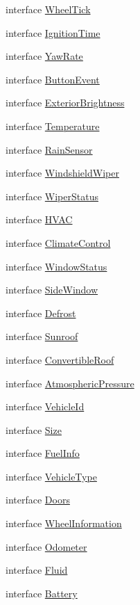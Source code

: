 \begin{DoxyCompactItemize}
interface \hyperlink{interfaceWheelTick}{Wheel\+Tick}
\item 
interface \hyperlink{interfaceIgnitionTime}{Ignition\+Time}
\item 
interface \hyperlink{interfaceYawRate}{Yaw\+Rate}
\item 
interface \hyperlink{interfaceButtonEvent}{Button\+Event}
\item 
interface \hyperlink{interfaceExteriorBrightness}{Exterior\+Brightness}
\item 
interface \hyperlink{interfaceTemperature}{Temperature}
\item 
interface \hyperlink{interfaceRainSensor}{Rain\+Sensor}
\item 
interface \hyperlink{interfaceWindshieldWiper}{Windshield\+Wiper}
\item 
interface \hyperlink{interfaceWiperStatus}{Wiper\+Status}
\item 
interface \hyperlink{interfaceHVAC}{H\+V\+A\+C}
\item 
interface \hyperlink{interfaceClimateControl}{Climate\+Control}
\item 
interface \hyperlink{interfaceWindowStatus}{Window\+Status}
\item 
interface \hyperlink{interfaceSideWindow}{Side\+Window}
\item 
interface \hyperlink{interfaceDefrost}{Defrost}
\item 
interface \hyperlink{interfaceSunroof}{Sunroof}
\item 
interface \hyperlink{interfaceConvertibleRoof}{Convertible\+Roof}
\item 
interface \hyperlink{interfaceAtmosphericPressure}{Atmospheric\+Pressure}
\item 
interface \hyperlink{interfaceVehicleId}{Vehicle\+Id}
\item 
interface \hyperlink{interfaceSize}{Size}
\item 
interface \hyperlink{interfaceFuelInfo}{Fuel\+Info}
\item 
interface \hyperlink{interfaceVehicleType}{Vehicle\+Type}
\item 
interface \hyperlink{interfaceDoors}{Doors}
\item 
interface \hyperlink{interfaceWheelInformation}{Wheel\+Information}
\item 
interface \hyperlink{interfaceOdometer}{Odometer}
\item 
interface \hyperlink{interfaceFluid}{Fluid}
\item 
interface \hyperlink{interfaceBattery}{Battery}

\end{DoxyCompactItemize}
